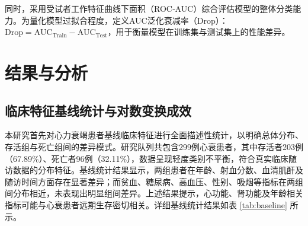 \documentclass[11pt,a4paper]{ctexart} %
\begin{document}
同时，采用受试者工作特征曲线下面积（ROC‑AUC）综合评估模型的整体分类能力。为量化模型过拟合程度，定义AUC泛化衰减率（Drop）：$\text{Drop} = \text{AUC}_{\text{Train}} - \text{AUC}_{\text{Test}}$，用于衡量模型在训练集与测试集上的性能差异。

\section{结果与分析}

\subsection{临床特征基线统计与对数变换成效}
本研究首先对心力衰竭患者基线临床特征进行全面描述性统计，以明确总体分布、存活组与死亡组间的差异模式。研究队列共包含299例心衰患者，其中存活者203例（67.89\%）、死亡者96例（32.11\%），数据呈现轻度类别不平衡，符合真实临床随访数据的分布特征。基线统计结果显示，两组患者在年龄、射血分数、血清肌酐及随访时间方面存在显著差异；而贫血、糖尿病、高血压、性别、吸烟等指标在两组间分布相近，未表现出明显组间差异。上述结果提示，心功能、肾功能及年龄相关指标可能与心衰患者远期生存密切相关。详细基线统计结果如表 \ref{tab:baseline} 所示。
\end{document}
